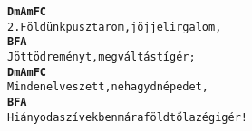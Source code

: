 \cleardoublepage
{}
\kottastart
{}
\kottaend
\begin{minipage}{\textwidth}
\begin{alltt}
\textbf{    Dm             Am   F           C}
2. Földünk puszta rom, jöjj el irgalom,
\textbf{    B               F           A}
   Jöttöd reményt, megváltást ígér;
\textbf{    Dm          Am    F            C}
   Minden elveszett, ne hagyd népedet,
\textbf{    B           F                            A}
   Hiányod a szívekben már a földtől az égig ér!
\end{alltt}
\vspace{0.0cm}
\versszakspacing
\end{minipage}
~\vspace{1.0cm}
\newline
